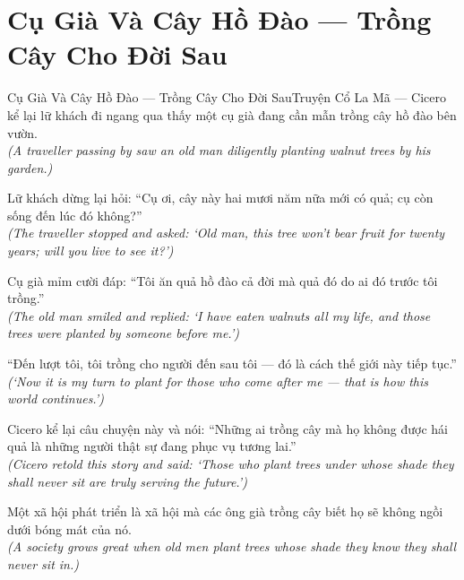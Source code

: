 \section{Cụ Già Và Cây Hồ Đào --- Trồng Cây Cho Đời Sau}
\begin{truyen}{Cụ Già Và Cây Hồ Đào --- Trồng Cây Cho Đời Sau}{Truyện Cổ La Mã --- Cicero kể lại}
 lữ khách đi ngang qua thấy một cụ già đang cần mẫn trồng cây hồ đào bên vườn.\\[4pt]
\textit{(A traveller passing by saw an old man diligently planting walnut trees by his garden.)}

Lữ khách dừng lại hỏi: ``Cụ ơi, cây này hai mươi năm nữa mới có quả; cụ còn sống đến lúc đó không?''\\[4pt]
\textit{(The traveller stopped and asked: `Old man, this tree won't bear fruit for twenty years; will you live to see it?')}

Cụ già mỉm cười đáp: ``Tôi ăn quả hồ đào cả đời mà quả đó do ai đó trước tôi trồng.''\\[4pt]
\textit{(The old man smiled and replied: `I have eaten walnuts all my life, and those trees were planted by someone before me.')}

``Đến lượt tôi, tôi trồng cho người đến sau tôi --- đó là cách thế giới này tiếp tục.''\\[4pt]
\textit{(`Now it is my turn to plant for those who come after me --- that is how this world continues.')}

Cicero kể lại câu chuyện này và nói: ``Những ai trồng cây mà họ không được hái quả là những người thật sự đang phục vụ tương lai.''\\[4pt]
\textit{(Cicero retold this story and said: `Those who plant trees under whose shade they shall never sit are truly serving the future.')}

\end{truyen}
\begin{baihoc}
  Một xã hội phát triển là xã hội mà các ông già trồng cây biết họ sẽ không ngồi dưới bóng mát của nó.\\[4pt]
  \textit{(A society grows great when old men plant trees whose shade they know they shall never sit in.)}
\end{baihoc}

